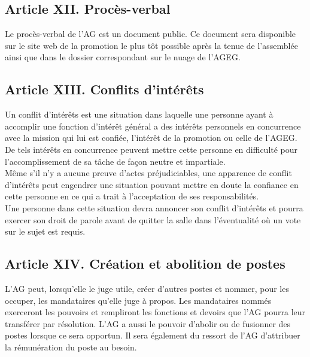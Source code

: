 \subsection*{Article XII. Procès-verbal}
Le procès-verbal de l’AG est un document public. Ce document sera disponible sur le site web de la promotion le plus tôt possible après la tenue de l’assemblée ainsi que dans le dossier correspondant sur le nuage de l’AGEG.

\subsection*{Article XIII. Conflits d'intérêts}
Un conflit d'intérêts est une situation dans laquelle une personne ayant à accomplir une fonction d'intérêt général a des intérêts personnels en concurrence avec la mission qui lui est confiée, l’intérêt de la promotion ou celle de l’AGEG. De tels intérêts en concurrence peuvent mettre cette personne en difficulté pour l’accomplissement de sa tâche de façon neutre et impartiale.\\

Même s'il n'y a aucune preuve d'actes préjudiciables, une apparence de conflit d'intérêts peut engendrer une situation pouvant mettre en doute la confiance en cette personne en ce qui a trait à l’acceptation de ses responsabilités.\\

Une personne dans cette situation devra annoncer son conflit d’intérêts et pourra exercer son droit de parole avant de quitter la salle dans l'éventualité où un vote sur le sujet est requis.

\subsection*{Article XIV. Création et abolition de postes}
L’AG peut, lorsqu’elle le juge utile, créer d’autres postes et nommer, pour les occuper, les mandataires qu'elle juge à propos. Les mandataires nommés exerceront les pouvoirs et rempliront les fonctions et devoirs que l'AG pourra leur transférer par résolution. L'AG a aussi le pouvoir d'abolir ou de fusionner des postes lorsque ce sera opportun. Il sera également du ressort de l’AG d’attribuer la rémunération du poste au besoin.

